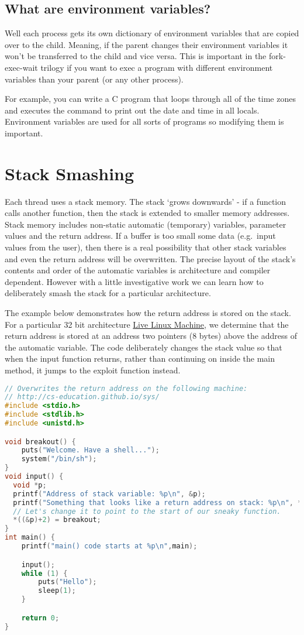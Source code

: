 \subsection{What are environment variables?}

Well each process gets its own dictionary of environment variables that are copied over to the child. Meaning, if the parent changes their environment variables it won't be transferred to the child and vice versa. This is important in the fork-exec-wait trilogy if you want to exec a program with different environment variables than your parent (or any other process).

For example, you can write a C program that loops through all of the time zones and executes the  command to print out the date and time in all locals. Environment variables are used for all sorts of programs so modifying them is important.

\section{Stack Smashing}

Each thread uses a stack memory. The stack `grows downwards' - if a function calls another function, then the stack is extended to smaller memory addresses. Stack memory includes non-static automatic (temporary) variables, parameter values and the return address. If a buffer is too small some data (e.g.~input values from the user), then there is a real possibility that other stack variables and even the return address will be overwritten. The precise layout of the stack's contents and order of the automatic variables is architecture and compiler dependent. However with a little investigative work we can learn how to deliberately smash the stack for a particular architecture.

The example below demonstrates how the return address is stored on the stack. For a particular 32 bit architecture \href{http://cs-education.github.io/sys/}{Live Linux Machine}, we determine that the return address is stored at an address two pointers (8 bytes) above the address of the automatic variable. The code deliberately changes the stack value so that when the input function returns, rather than continuing on inside the main method, it jumps to the exploit function instead.

\begin{lstlisting}[language=C]
// Overwrites the return address on the following machine:
// http://cs-education.github.io/sys/
#include <stdio.h>
#include <stdlib.h>
#include <unistd.h>

void breakout() {
    puts("Welcome. Have a shell...");
    system("/bin/sh");
}
void input() {
  void *p;
  printf("Address of stack variable: %p\n", &p);
  printf("Something that looks like a return address on stack: %p\n", *((&p)+2));
  // Let's change it to point to the start of our sneaky function.
  *((&p)+2) = breakout;
}
int main() {
    printf("main() code starts at %p\n",main);

    input();
    while (1) {
        puts("Hello");
        sleep(1);
    }

    return 0;
}
\end{lstlisting}

